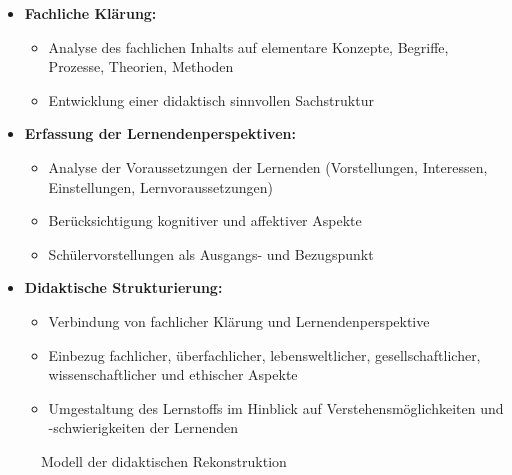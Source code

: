 \begin{itemize}
  \item \textbf{Fachliche Klärung:}
        \begin{itemize}
          \item Analyse des fachlichen Inhalts auf elementare Konzepte, Begriffe, Prozesse, Theorien, Methoden
          \item Entwicklung einer didaktisch sinnvollen Sachstruktur
        \end{itemize}
  \item \textbf{Erfassung der Lernendenperspektiven:}
        \begin{itemize}
          \item Analyse der Voraussetzungen der Lernenden (Vorstellungen, Interessen, Einstellungen, Lernvoraussetzungen)
          \item Berücksichtigung kognitiver und affektiver Aspekte
          \item Schülervorstellungen als Ausgangs- und Bezugspunkt
        \end{itemize}
  \item \textbf{Didaktische Strukturierung:}
        \begin{itemize}
          \item Verbindung von fachlicher Klärung und Lernendenperspektive
          \item Einbezug fachlicher, überfachlicher, lebensweltlicher, gesellschaftlicher, wissenschaftlicher und ethischer Aspekte
          \item Umgestaltung des Lernstoffs im Hinblick auf Verstehensmöglichkeiten und -schwierigkeiten der Lernenden
        \end{itemize}
\end{itemize}

\begin{figure}[h!]
  \centering
  \caption{Modell der didaktischen Rekonstruktion}
\end{figure}

